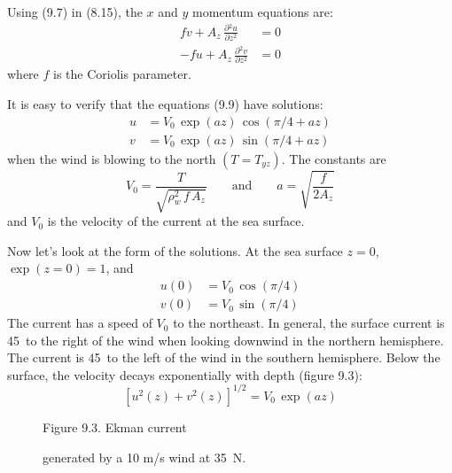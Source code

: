Using (9.7) in (8.15), the $x$ and $y$ momentum equations are:
\begin{subequations}
\begin{align}
fv +  A_z \, \frac{\partial{^2 u}}{\partial{z^2}} &= 0  \\
-fu + A_z \, \frac{\partial{^2 v}}{\partial{z^2}} &= 0
\end{align}
\end{subequations}
where $f$ is the Coriolis parameter.

It is easy to verify that the equations (9.9) have solutions:
\begin{subequations}
\begin{align}
u &=  V_0\,\exp(az)\,\cos(\pi/4 + az)  \\
v &=  V_0\,\exp(az)\,\sin(\pi/4 + az)
\end{align}
\end{subequations}
when the wind is blowing to the north $(T = T_{yz})$. The constants
are
\begin{equation}
V_0 = \frac{T}{\sqrt{\rho^2_w\,f\,A_z}} \qquad \text{and} \qquad
a=\sqrt{\frac{f}{2A_z}}
\end{equation}
and $V_0$ is the velocity of the current at the sea surface.

Now let's look at the form of the solutions. At the sea surface $z = 0$,
$\exp(z=0) = 1$, and
\begin{subequations}
\begin{align}
u(0) &= V_0\, \cos(\pi/4)  \\
v(0) &= V_0\, \sin(\pi/4)
\end{align}
\end{subequations}
The current has a speed of $V_0$ to the northeast. In general, the
surface current is 45\degrees\ to the right of the wind when looking
downwind in the northern hemisphere. The current is 45\degrees\ to the
left of the wind in the southern hemisphere. Below the surface, the
velocity decays exponentially with depth (figure 9.3):
\begin{equation}
\left[u^2(z) + v^2(z) \right]^{1/2} =V_0\,\exp(az)
\end{equation}

\begin{figure}[h!]
\centering
\footnotesize
Figure 9.3. Ekman current \rule{0mm}{4ex}generated by a 10 m/s wind at
35\degrees\ N.

\label{fig:ekmancurrent}
\end{figure}

